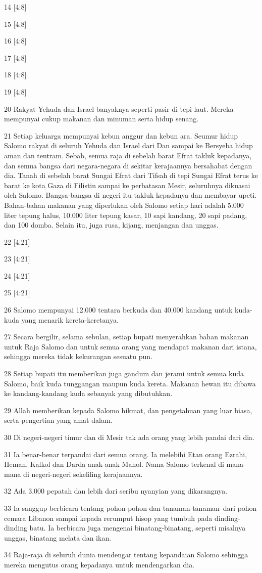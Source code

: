 \par 14 [4:8]
\par 15 [4:8]
\par 16 [4:8]
\par 17 [4:8]
\par 18 [4:8]
\par 19 [4:8]
\par 20 Rakyat Yehuda dan Israel banyaknya seperti pasir di tepi laut. Mereka mempunyai cukup makanan dan minuman serta hidup senang.
\par 21 Setiap keluarga mempunyai kebun anggur dan kebun ara. Seumur hidup Salomo rakyat di seluruh Yehuda dan Israel dari Dan sampai ke Bersyeba hidup aman dan tentram. Sebab, semua raja di sebelah barat Efrat takluk kepadanya, dan semua bangsa dari negara-negara di sekitar kerajaannya bersahabat dengan dia. Tanah di sebelah barat Sungai Efrat dari Tifsah di tepi Sungai Efrat terus ke barat ke kota Gaza di Filistin sampai ke perbatasan Mesir, seluruhnya dikuasai oleh Salomo. Bangsa-bangsa di negeri itu takluk kepadanya dan membayar upeti. Bahan-bahan makanan yang diperlukan oleh Salomo setiap hari adalah 5.000 liter tepung halus, 10.000 liter tepung kasar, 10 sapi kandang, 20 sapi padang, dan 100 domba. Selain itu, juga rusa, kijang, menjangan dan unggas.
\par 22 [4:21]
\par 23 [4:21]
\par 24 [4:21]
\par 25 [4:21]
\par 26 Salomo mempunyai 12.000 tentara berkuda dan 40.000 kandang untuk kuda-kuda yang menarik kereta-keretanya.
\par 27 Secara bergilir, selama sebulan, setiap bupati menyerahkan bahan makanan untuk Raja Salomo dan untuk semua orang yang mendapat makanan dari istana, sehingga mereka tidak kekurangan sesuatu pun.
\par 28 Setiap bupati itu memberikan juga gandum dan jerami untuk semua kuda Salomo, baik kuda tunggangan maupun kuda kereta. Makanan hewan itu dibawa ke kandang-kandang kuda sebanyak yang dibutuhkan.
\par 29 Allah memberikan kepada Salomo hikmat, dan pengetahuan yang luar biasa, serta pengertian yang amat dalam.
\par 30 Di negeri-negeri timur dan di Mesir tak ada orang yang lebih pandai dari dia.
\par 31 Ia benar-benar terpandai dari semua orang. Ia melebihi Etan orang Ezrahi, Heman, Kalkol dan Darda anak-anak Mahol. Nama Salomo terkenal di mana-mana di negeri-negeri sekeliling kerajaannya.
\par 32 Ada 3.000 pepatah dan lebih dari seribu nyanyian yang dikarangnya.
\par 33 Ia sanggup berbicara tentang pohon-pohon dan tanaman-tanaman--dari pohon cemara Libanon sampai kepada rerumput hisop yang tumbuh pada dinding-dinding batu. Ia berbicara juga mengenai binatang-binatang, seperti misalnya unggas, binatang melata dan ikan.
\par 34 Raja-raja di seluruh dunia mendengar tentang kepandaian Salomo sehingga mereka mengutus orang kepadanya untuk mendengarkan dia.

